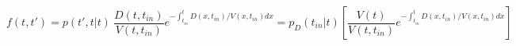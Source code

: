 \begin{equation}
f(t,t') = p(t',t|t) \ \frac{D(t,t_{in})}{V(t,t_{in})}e^{-\int_{t_{in}}^t D(x,t_{in})/V(x,t_{in}) dx} = p_D(t_{in}|t)\left[ \frac{V(t)}{V(t,t_{in})} e^{-\int_{t_{in}}^t D(x,t_{in})/V(x,t_{in}) dx}\right]
\end{equation}